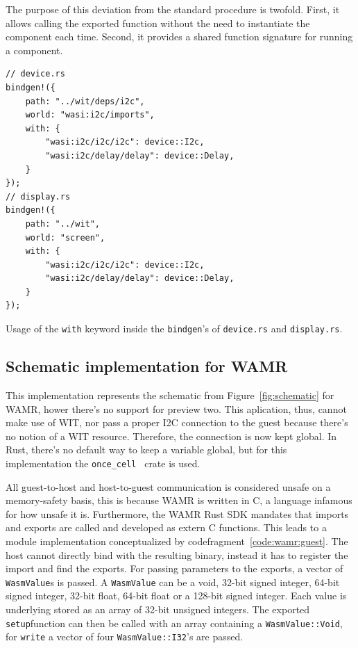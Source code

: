 The purpose of this deviation from the standard procedure is twofold. First, it allows calling the exported function without the need to instantiate the component each time. Second, it provides a shared function signature for running a component.

\begin{listing}[h]
\begin{verbatim}
// device.rs
bindgen!({
    path: "../wit/deps/i2c",
    world: "wasi:i2c/imports",
    with: {
        "wasi:i2c/i2c/i2c": device::I2c,
        "wasi:i2c/delay/delay": device::Delay,
    }
});
// display.rs
bindgen!({
    path: "../wit",
    world: "screen",
    with: {
        "wasi:i2c/i2c/i2c": device::I2c,
        "wasi:i2c/delay/delay": device::Delay,
    }
});
\end{verbatim}
\caption{Usage of the \texttt{with} keyword inside the \texttt{bindgen}'s of \texttt{device.rs} and \texttt{display.rs}.}
\label{code:with}
\end{listing}

\subsection{Schematic implementation for WAMR}

This implementation represents the schematic from Figure~\ref{fig:schematic} for WAMR, hower there's no support for preview two. This aplication, thus, cannot make use of \gls{WIT}, nor pass a proper I2C connection to the guest because there's no notion of a WIT resource. Therefore, the connection is now kept global. In Rust, there's no default way to keep a variable global, but for this implementation the \texttt{once\_cell}~\cite{gh:once-cell} crate is used. 

All guest-to-host and host-to-guest communication is considered unsafe on a memory-safety basis, this is because WAMR is written in C, a language infamous for how unsafe it is. Furthermore, the WAMR Rust SDK mandates that imports and exports are called and developed as extern C functions. This leads to a module implementation conceptualized by codefragment~\ref{code:wamr:guest}. The host cannot directly bind with the resulting binary, instead it has to register the import and find the exports. 
For passing parameters to the exports, a vector of \texttt{WasmValue}s is passed. A \texttt{WasmValue} can be a void, 32-bit signed integer, 64-bit signed integer, 32-bit float, 64-bit float or a 128-bit signed integer. Each value is underlying stored as an array of 32-bit unsigned integers. The exported \texttt{setup}function can then be called with an array containing a \texttt{WasmValue::Void}, for \texttt{write} a vector of four \texttt{WasmValue::I32}'s are passed.

